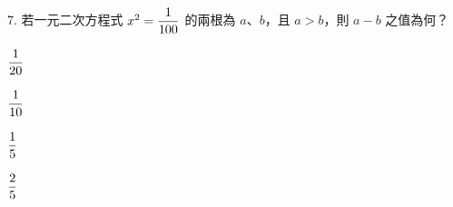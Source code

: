 \documentclass[12pt]{article}
\begin{document}
\begin{problem}
  \item[7.] 若一元二次方程式 $x^2 = \fraction{1}{100}$ 的兩根為 $a$、$b$，且 $a > b$，則 $a - b$ 之值為何？
  \begin{choices}
    \item $\fraction{1}{20}$
    \item $\fraction{1}{10}$
    \item $\fraction{1}{5}$
    \item $\fraction{2}{5}$
  \end{choices}
\end{problem}
\end{document}
